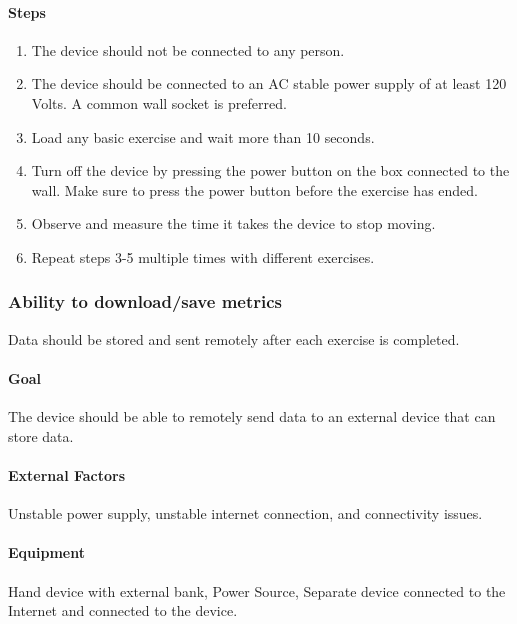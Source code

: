 \documentclass{article}
\begin{document}
\paragraph{Steps}
\begin{enumerate}
\item The device should not be connected to any person.
\item The device should be connected to an AC stable power supply of at least 120 Volts. A common wall socket is preferred.
\item Load any basic exercise and wait more than 10 seconds.
\item Turn off the device by pressing the power button on the box connected to the wall. Make sure to press the power button before the exercise has ended.
\item Observe and measure the time it takes the device to stop moving.
\item Repeat steps 3-5 multiple times with different exercises.
\end{enumerate}

\subsubsection{Ability to download/save metrics}
Data should be stored and sent remotely after each exercise is completed.

\paragraph{Goal} The device should be able to remotely send data to an external device that can store data.

\paragraph{External Factors} Unstable power supply, unstable internet connection, and connectivity issues.

\paragraph{Equipment} Hand device with external bank, Power Source, Separate device connected to the Internet and connected to the device.
\end{document}
